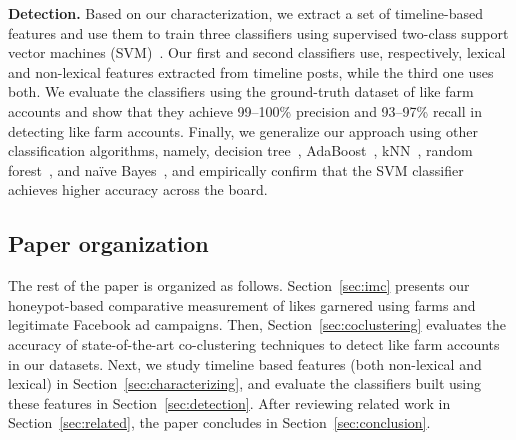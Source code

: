 \documentclass[twocolumn,10pt,letterpaper]{article}
\newcommand{\descr}[1]{\smallskip\noindent\textbf{#1}}
\begin{document}
\descr{Detection.} Based on our characterization, we extract a set of timeline-based features and use them to train three classifiers using supervised two-class support vector machines (SVM)~\cite{Muller01anintroduction}.  Our first and second classifiers use, respectively, lexical and non-lexical features extracted from timeline posts, while the third one uses both. We evaluate the classifiers using the ground-truth dataset of like farm accounts and show that they achieve 99--100\% precision and 93--97\% recall in detecting like farm accounts. Finally, we generalize our approach using other classification algorithms, namely, decision tree~\cite{dtree}, AdaBoost~\cite{adaboost}, kNN~\cite{knn}, random forest~\cite{Breiman:rf}, and na\"ive Bayes~\cite{zhang2004optimality}, and empirically confirm that the SVM classifier achieves higher accuracy across the board.


\subsection{Paper organization}
 The rest of the paper is organized as follows. Section~\ref{sec:imc} presents our honeypot-based comparative measurement of likes garnered using farms and legitimate Facebook ad campaigns. Then, Section~\ref{sec:coclustering} evaluates the accuracy of state-of-the-art co-clustering techniques to detect like farm accounts in our datasets. Next, we study timeline based features (both non-lexical and lexical) in Section~\ref{sec:characterizing}, and evaluate the classifiers built using these features in Section~\ref{sec:detection}. After reviewing related work in Section~\ref{sec:related}, the paper concludes in Section~\ref{sec:conclusion}.
\end{document}
